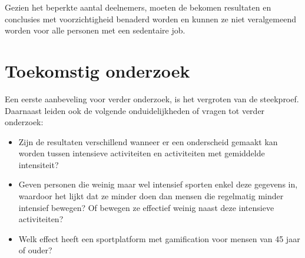 \documentclass[a0,portrait]{hogent-poster}
\begin{document}
\begin{multicols}{2}
Gezien het beperkte aantal deelnemers, moeten de bekomen resultaten en conclusies met voorzichtigheid benaderd worden en kunnen ze niet veralgemeend worden voor alle personen met een sedentaire job.

\section{Toekomstig onderzoek}

Een eerste aanbeveling voor verder onderzoek, is het vergroten van de
steekproef. Daarnaast leiden ook de volgende onduidelijkheden of vragen tot verder onderzoek:

\begin{itemize}
    \item Zijn de resultaten verschillend wanneer er een onderscheid gemaakt kan worden tussen intensieve activiteiten en activiteiten met gemiddelde intensiteit?
    \item Geven personen die weinig maar wel intensief sporten enkel deze gegevens in, waardoor het lijkt dat ze minder doen dan mensen die regelmatig minder intensief bewegen? Of bewegen ze effectief weinig naast deze intensieve activiteiten?
    \item Welk effect heeft een sportplatform met gamification voor mensen van 45 jaar of ouder?
\end{itemize}


\end{multicols}
\end{document}
